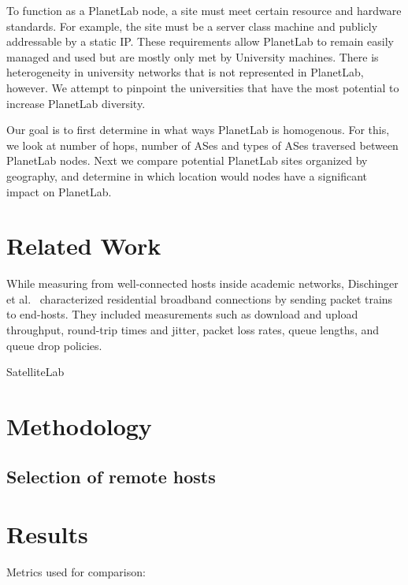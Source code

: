 \documentclass{sig-alternate-10pt}
\begin{document}
To function as a PlanetLab node, a site must meet certain resource and hardware
standards. For example, the site must be a server class machine and publicly
addressable by a static IP. These requirements allow PlanetLab to remain easily
managed and used but are mostly only met by University machines. There is
heterogeneity in university networks that is not represented in PlanetLab,
however. We attempt to pinpoint the universities that have the most potential
to increase PlanetLab diversity.  

Our goal is to first determine in what ways PlanetLab is homogenous. For this,
we look at number of hops, number of ASes and types of ASes traversed between
PlanetLab nodes. Next we compare potential PlanetLab sites organized by
geography, and determine in which location would nodes have a significant
impact on PlanetLab. 


\section{Related Work} 

While measuring from well-connected hosts inside academic networks, Dischinger
et al.~\cite{dischinger:residential} characterized residential broadband
connections by sending packet trains to end-hosts. They included measurements
such as download and upload throughput, round-trip times and jitter, packet
loss rates, queue lengths, and queue drop policies. 

SatelliteLab~\cite{dischinger:satellitelab} 


\section{Methodology}

\subsection{Selection of remote hosts}

\section{Results}

Metrics used for comparison:
\end{document}

